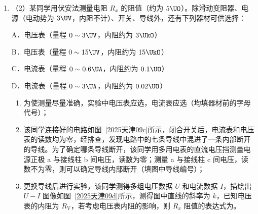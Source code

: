 \documentclass[\gkver]{gaokaozhenti}
\begin{document}
\begin{enumerate}
{②水平方向，钢球做匀速直线运动，所以位移随时间均匀增大，即图线甲为水平位移随时间变化的图线，此次钢球做平抛运动的初速度为
$v = \frac{0.3}{0.15} \Ums = 2 \Ums$
}

\item[]
（2）某同学用伏安法测量电阻 $R_{x}$ 的阻值（约为 $5 \UO$）。除滑动变阻器、电源（电动势为 $3 \UV$，内阻不计）、开关、导线外，还有下列器材可供选择：

A．电压表（量程 $0 \sim 3 \UV$，内阻约为 $3 \UkO$）

B．电压表（量程 $0 \sim 15 \UV$，内阻约为 $15 \UkO$）

C．电流表（量程 $0 \sim 0.6 \UA$，内阻约为 $0.1 \UO$）

D．电流表（量程 $0 \sim 3 \UA$，内阻约为 $0.02 \UO$）

\begin{enumerate}[label=\protect\Circled{\arabic*}]
\item
为使测量尽量准确，实验中电压表应选，电流表应选（均填器材前的字母代号）；
\item
该同学连接好的电路如图~\ref{2025天津09c}所示，闭合开关后，电流表和电压表的读数均为零，经排查，发现电路中的七条导线中混进了一条内部断开的导线。为了确定哪条导线断开，该同学用多用电表的直流电压挡测量电源正极 a 与接线柱 b 间电压，读数为零；测量 a 与接线柱 c 间电压，读数不为零，则可以确定导线内部断开（填图中导线编号）；
\item
更换导线后进行实验，该同学测得多组电压数据 $U$ 和电流数据 $I$，描绘出 $U-I$ 图像如图~\ref{2025天津09d}所示，测得图中直线的斜率为 $k$，已知电压表的内阻为 $R_{\mathrm{V}}$，若考虑电压表内阻的影响，则 $R_{x}$ 阻值的表达式为。
\end{enumerate}


\end{enumerate}
\end{document}
